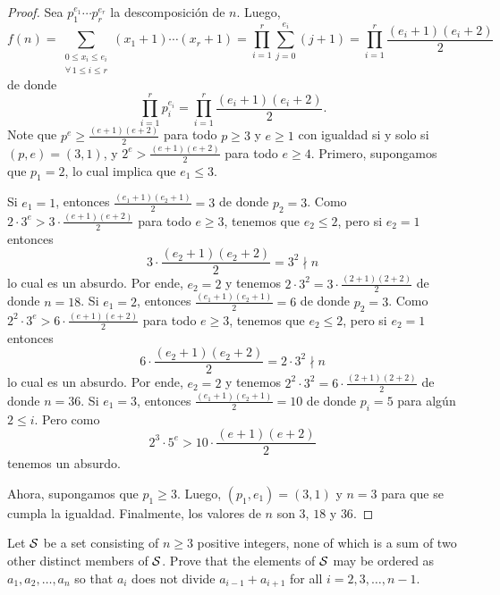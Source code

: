 \begin{proof}
  Sea $p_1^{e_1}\cdots p_r^{e_r}$ la descomposición de $n$. Luego,
  \[
    f(n)
    =\sum_{\substack{0\le x_i\le e_i\\\forall\,1\le i\le r}}(x_1+1)\cdots(x_r+1)
    =\prod_{i=1}^r\sum_{j=0}^{e_i}(j+1)
    =\prod_{i=1}^r\frac{(e_i+1)(e_i+2)}{2}
  \]
  de donde
  \[\prod_{i=1}^rp_i^{e_i}=\prod_{i=1}^r\frac{(e_i+1)(e_i+2)}{2}.\]
  Note que $p^e\ge\frac{(e+1)(e+2)}{2}$ para todo $p\ge 3$ y $e\ge 1$ con
  igualdad si y solo si $(p,e)=(3,1)$, y $2^e>\frac{(e+1)(e+2)}{2}$ para todo
  $e\ge 4$. Primero, supongamos que $p_1=2$, lo cual implica que $e_1\le 3$.
  \begin{itemize}
    \ii Si $e_1=1$, entonces $\frac{(e_1+1)(e_2+1)}{2}=3$ de donde $p_2=3$. Como
    $2\cdot 3^e>3\cdot\frac{(e+1)(e+2)}{2}$ para todo $e\ge 3$, tenemos que
    $e_2\le 2$, pero si $e_2=1$ entonces
    \[3\cdot\frac{(e_2+1)(e_2+2)}{2}=3^2\nmid n\]
    lo cual es un absurdo. Por ende, $e_2=2$ y tenemos
    $2\cdot 3^2=3\cdot\frac{(2+1)(2+2)}{2}$ de donde $n=18$.
    \ii Si $e_1=2$, entonces $\frac{(e_1+1)(e_2+1)}{2}=6$ de donde $p_2=3$. Como
    $2^2\cdot 3^e>6\cdot\frac{(e+1)(e+2)}{2}$ para todo $e\ge 3$, tenemos que
    $e_2\le 2$, pero si $e_2=1$ entonces
    \[6\cdot\frac{(e_2+1)(e_2+2)}{2}=2\cdot 3^2\nmid n\]
    lo cual es un absurdo. Por ende, $e_2=2$ y tenemos
    $2^2\cdot 3^2=6\cdot\frac{(2+1)(2+2)}{2}$ de donde $n=36$.
    \ii Si $e_1=3$, entonces $\frac{(e_1+1)(e_2+1)}{2}=10$ de donde $p_i=5$ para
    algún $2\le i$. Pero como
    \[2^3\cdot 5^e>10\cdot\frac{(e+1)(e+2)}{2}\]
    tenemos un absurdo.
  \end{itemize}
  Ahora, supongamos que $p_1\ge 3$. Luego, $(p_1,e_1)=(3,1)$ y $n=3$ para que se
  cumpla la igualdad. Finalmente, los valores de $n$ son $3$, $18$ y $36$.
\end{proof}

\begin{probHR}[ISL 2020/N7]
  Let $\cal S$ be a set consisting of $n\ge 3$ positive integers, none of which
  is a sum of two other distinct members of $\cal S$. Prove that the elements of
  $\cal S$ may be ordered as $a_1,a_2,\dots,a_n$ so that $a_i$ does not divide
  $a_{i-1}+a_{i+1}$ for all $i=2,3,\dots,n-1$.
\end{probHR}

